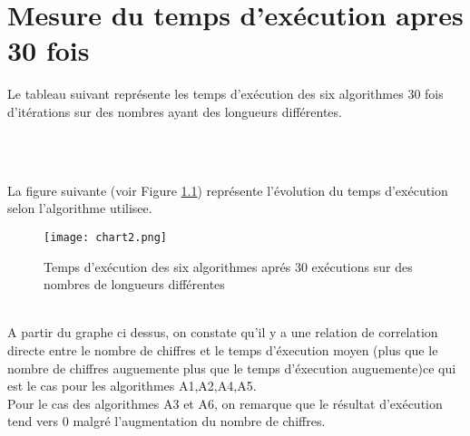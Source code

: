 \chapter{Mesure du temps d'exécution apres 30 fois}
Le tableau suivant représente les temps d'exécution des six algorithmes  30 fois d'itérations sur des nombres ayant des longueurs différentes.
\\
\par
\small
{}
\\ \\
\normalsize
\par
La figure suivante (voir Figure \ref{fig:chart}) représente l'évolution du temps d'exécution selon l'algorithme utilisee.

\begin{figure}[H]
    \centering
        \texttt{[image: chart2.png]}
        \caption{Temps d'exécution des six algorithmes aprés 30 exécutions sur des nombres de longueurs différentes}
    \label{fig:chart}
\end{figure}
\\ 
A partir du graphe ci dessus, on constate qu'il y a une relation de correlation directe entre le nombre de chiffres et le temps d'éxecution moyen (plus que le nombre de chiffres auguemente plus que le temps d'éxecution auguemente)ce qui est le cas pour les algorithmes A1,A2,A4,A5.
\\
Pour le cas des algorithmes A3 et A6, on remarque que le résultat d'exécution tend vers 0 malgré l'augmentation du nombre de chiffres. 

